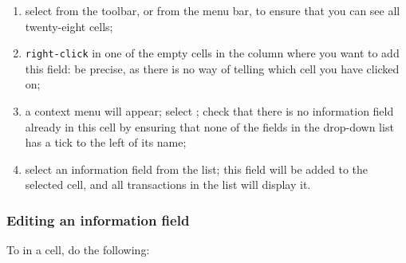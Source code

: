 \begin{enumerate}
	\item select  from the toolbar, or  from the menu bar, to ensure that you can see all twenty-eight cells;
	\item \texttt{right-click} in one of the empty cells in the column where you want to add this field: be precise, as there is no way of telling which cell you have clicked on;
	\item a context menu will appear; select ; check that there is no information field already in this cell by ensuring that none of the fields in the drop-down list has a tick to the left of its name;
	\item select an information field from the list; this field will be added to the selected cell, and all transactions in the list will display it.
\end{enumerate}


\subsubsection{Editing an information field\label{transactions-list-fields-modify}}

To  in a cell, do the following:

